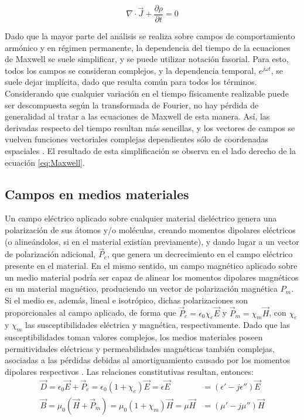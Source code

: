 \begin{equation}
	\label{eq:continuidad}
	\nabla \cdot \vec{J} + \frac{\partial \rho}{\partial t} = 0
\end{equation}

Dado que la mayor parte del análisis se realiza sobre campos de comportamiento armónico y en régimen permanente, la dependencia del tiempo de la ecuaciones de Maxwell se suele simplificar, y se puede utilizar notación fasorial. Para esto, todos los campos se consideran complejos, y la dependencia temporal, $e^{j \omega t}$, se suele dejar implícita, dado que resulta común para todos los términos. Considerando que cualquier variación en el tiempo físicamente realizable puede ser descompuesta según la transformada de Fourier, no hay pérdida de generalidad al tratar a las ecuaciones de Maxwell de esta manera. Así, las derivadas respecto del tiempo resultan más sencillas, y los vectores de campos se vuelven funciones vectoriales complejas dependientes sólo de coordenadas espaciales \cite{Collin:GuidedWaves}. El resultado de esta simplificación se observa en el lado derecho de la ecuación \ref{eq:Maxwell}.

\subsection{Campos en medios materiales}
\label{subsec_campos_en_dielectricos}

Un campo eléctrico aplicado sobre cualquier material dieléctrico genera una polarización de sus átomos y/o moléculas, creando momentos dipolares eléctricos (o alineándolos, si en el material existían previamente), y dando lugar a un vector de polarización adicional, $\vec{P}_e$, que genera un decrecimiento en el campo eléctrico presente en el material. En el mismo sentido, un campo magnético aplicado sobre un medio material podría ser capaz de alinear los momentos dipolares magnéticos en un material magnético, produciendo un vector de polarización magnética $P_m$. Si el medio es, además, lineal e isotrópico, dichas polarizaciones son proporcionales al campo aplicado, de forma que $\vec{P}_e = \epsilon_0 \chi_e \vec{E}$ y $\vec{P}_m = \chi_m \vec{H}$, con $\chi_e$ y $\chi_m$ las susceptibilidades eléctrica y magnética, respectivamente. Dado que las susceptibilidades toman valores complejos, los medios materiales poseen permitividades eléctricas y permeabilidades magnéticas también complejas, asociadas a las pérdidas debidas al amortiguamiento causado por los momentos dipolares respectivos \cite{Fernandez:Electromag}. Las relaciones constitutivas resultan, entonces:
\begin{subequations}
	\label{eq:polarization_vector}
	\begin{align}
		\vec{D} = \epsilon_0 \vec{E} + \vec{P}_e = \epsilon_0 (1+\chi_e)\vec{E} = \epsilon \vec{E} &= (\epsilon' - j \epsilon'') \vec{E}\\
		\vec{B} = \mu_0 (\vec{H} + \vec{P}_m) = \mu_0 (1+\chi_m)\vec{H} = \mu \vec{H} &= (\mu' - j \mu'') \vec{H}
	\end{align}
\end{subequations}


